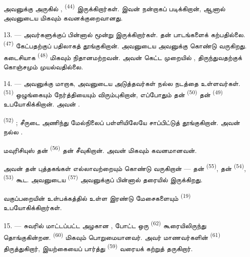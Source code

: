 அவனுக்கு அருகில் , 
\textsuperscript{(44)} இருக்கிறார்கள். இவன் நன்றாகப் படிக்கிறான், ஆனால்
அவனுடைய  மிகவும் கவனக்குறைவானது.

13. --- அவர்களுக்குப் பின்னால் மூன்று  இருக்கிறார்கள்.
 தன் பாடங்களைக் கற்பதில்லை. 
\textsuperscript{(47)} கேட்பதற்குப் பதிலாகத் தூங்குகிறான். அவனுடைய
 அவனுக்கு  
கொண்டு வருகிறது. கடைசியாக  \textsuperscript{(48)}
மிகவும் நிதானமற்றவன். அவன் கெட்ட முறையில் ,
திருந்துவதற்குக் கொஞ்சமும் முயல்வதில்லை.

14. --- அவனுக்கு மாறாக, அவனுடைய அடுத்தவர்கள் நல்ல நடத்தை உள்ளவர்கள்.
 \textsuperscript{(51)} ஒழுங்கையும் நேர்த்தியையும்
விரும்புகிறான், எப்போதும் தன்  \textsuperscript{(50)} தன்
 \textsuperscript{(49)} உபயோகிக்கிறான். அவன்
.

 \textsuperscript{(52)}  ; சீருடை
அணிந்து மேல்நிலைப் பள்ளியிலேயே சாப்பிட்டுத் தூங்குகிறான். அவன் நல்ல
.

மவுரிசியுஸ் தன்  \textsuperscript{(56)} தன்
 சீவுகிறான். அவன் மிகவும் கவனமானவன்.

அவன் தன் புத்தகங்கள் எல்லாவற்றையும் கொண்டு வருகிறான் — தன்
 \textsuperscript{(55)}, தன் 
\textsuperscript{(54)},  \textsuperscript{(53)}
கூட. அவனுடைய  \textsuperscript{(57)} அவனுக்குப் பின்னால்
தரையில் இருக்கிறது.

வகுப்பறையின் உள்பக்கத்தில் உள்ள இரண்டு மேசைகளையும்
 \textsuperscript{(19)} உபயோகிக்கிறார்கள்.

\VUsaut{4.6mm}
\VUsaut{3.4mm}

15. ---  சுவரில் மாட்டப்பட்ட அழகான ,
 போட்ட ஒரு  \textsuperscript{(62)}
கூரையிலிருந்து தொங்குகின்றன.  \textsuperscript{(60)} மிகவும்
பொறுமையானவர். அவர் மாணவர்களின்  \textsuperscript{(61)}
திருத்துகிறார், இயற்கையைப் பார்த்து 
\textsuperscript{(59)} வரையக் கற்றுத் தருகிறார்.

